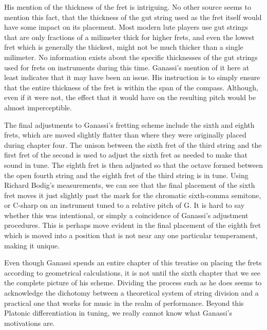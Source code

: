 His mention of the thickness of the fret is intriguing.  No other source seems to mention
this fact, that the thickness of the gut string used as the fret itself would have some
impact on its placement.  Most modern lute players use gut strings that are only
fractions of a milimeter thick for higher frets, and even the lowest fret which is generally
the thickest, might not be much thicker than a single milimeter.  No information exists
about the specific thicknesses of the gut strings used for frets on instruments during this
time.  Ganassi's mention of it here at least indicates that it may have been an issue.  His
instruction is to simply ensure that the entire thickness of the fret is within the span of the
compass.  Although, even if it were not, the effect that it would have on the resulting pitch
would be almost imperceptible.

The final adjustments to Ganassi's fretting scheme include the sixth and eighth frets, which are
moved slightly flatter than where they were originally placed during chapter four.
The unison between the sixth fret of the third string
and the first fret of the second is used to adjust the sixth fret as needed to make that sound
in tune.  The eighth fret is then adjusted so that the octave formed between the open fourth
string and the eighth fret of the third string is in tune.  Using Richard Bodig's measurements,
we can see that the final placement of the sixth
fret moves it just slightly past the mark for the chromatic sixth-comma semitone, or C-sharp on
an instrument tuned to a relative pitch of G.  It is hard to say whether this was intentional,
or simply a coincidence of Ganassi's adjustment procedures.  This is perhaps move evident in the
final placement of the eighth fret which is moved into a position that is not near any one
particular temperament, making it unique.





Even though Ganassi spends an entire chapter of this treatise on placing the
frets according to geometrical calculations, it is not until the sixth
chapter that we see the complete picture of his scheme.  Dividing the process
such as he does seems to acknowledge the dichotomy between a
theoretical system of string division and a practical one that works for music in the
realm of performance.  Beyond this Platonic differentiation in tuning, we really cannot know
what Ganassi's motivations are.

